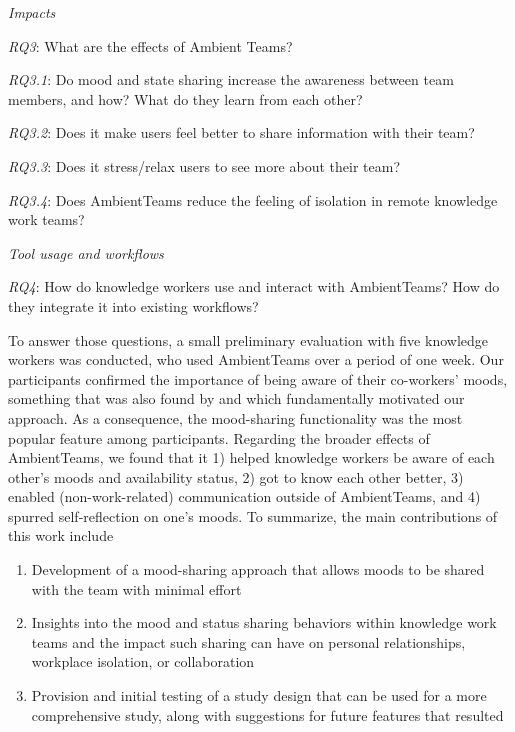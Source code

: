 \medskip\noindent\textit{Impacts}

\smallskip\noindent\textit{RQ3}: What are the effects of Ambient Teams?

\setlength{\leftskip}{0.5cm}
\smallskip\noindent\textit{RQ3.1}: Do mood and state sharing increase the awareness between team members, and how? What do they learn from each other?

\smallskip\noindent\textit{RQ3.2}: Does it make users feel better to share information with their team?

\smallskip\noindent\textit{RQ3.3}: Does it stress/relax users to see more about their team?

\smallskip\noindent\textit{RQ3.4}: Does AmbientTeams reduce the feeling of isolation in remote knowledge work teams?

\setlength{\leftskip}{0pt}

\medskip\noindent\textit{Tool usage and workflows}

\smallskip\noindent\textit{RQ4}: How do knowledge workers use and interact with AmbientTeams? How do they integrate it into existing workflows?

\bigskip\noindent To answer those questions, a small preliminary evaluation with five knowledge workers was conducted, who used AmbientTeams over a period of one week. Our participants confirmed the importance of being aware of their co-workers' moods, something that was also found by \textcite{garcia1999emotional, dullemond2013fixing} and which fundamentally motivated our approach. As a consequence, the mood-sharing functionality was the most popular feature among participants. Regarding the broader effects of AmbientTeams, we found that it 1) helped knowledge workers be aware of each other's moods and availability status, 2) got to know each other better, 3) enabled (non-work-related) communication outside of AmbientTeams, and 4) spurred self-reflection on one's moods. To summarize, the main contributions of this work include

\begin{enumerate}
    \item Development of a mood-sharing approach that allows moods to be shared with the team with minimal effort
    \item Insights into the mood and status sharing behaviors within knowledge work teams and the impact such sharing can have on personal relationships, workplace isolation, or collaboration
    \item Provision and initial testing of a study design that can be used for a more comprehensive study, along with suggestions for future features that resulted
\end{enumerate}
